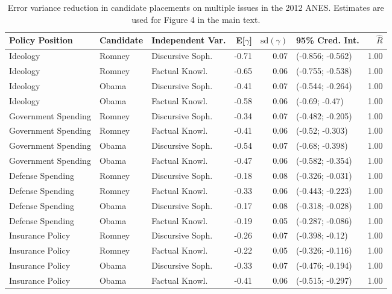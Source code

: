 \begin{table}[ht]
\centering
\caption{Error variance reduction in candidate placements on multiple issues in the 2012 ANES. 
         Estimates are used for Figure 4 in the main text.} 
\label{app:hetreg2012}
\begin{tabular}{lllrrlr}
  \hline
Policy Position & Candidate & Independent Var. & E[$\gamma$] & $\text{sd}(\gamma)$ & 95\% Cred. Int. & $\hat{R}$ \\ 
  \hline
Ideology & Romney & Discursive Soph. & -0.71 & 0.07 & (-0.856; -0.562) & 1.00 \\ 
  Ideology & Romney & Factual Knowl. & -0.65 & 0.06 & (-0.755; -0.538) & 1.00 \\ 
  Ideology & Obama & Discursive Soph. & -0.41 & 0.07 & (-0.544; -0.264) & 1.00 \\ 
  Ideology & Obama & Factual Knowl. & -0.58 & 0.06 & (-0.69; -0.47) & 1.00 \\ 
  Government Spending & Romney & Discursive Soph. & -0.34 & 0.07 & (-0.482; -0.205) & 1.00 \\ 
  Government Spending & Romney & Factual Knowl. & -0.41 & 0.06 & (-0.52; -0.303) & 1.00 \\ 
  Government Spending & Obama & Discursive Soph. & -0.54 & 0.07 & (-0.68; -0.398) & 1.00 \\ 
  Government Spending & Obama & Factual Knowl. & -0.47 & 0.06 & (-0.582; -0.354) & 1.00 \\ 
  Defense Spending & Romney & Discursive Soph. & -0.18 & 0.08 & (-0.326; -0.031) & 1.00 \\ 
  Defense Spending & Romney & Factual Knowl. & -0.33 & 0.06 & (-0.443; -0.223) & 1.00 \\ 
  Defense Spending & Obama & Discursive Soph. & -0.17 & 0.08 & (-0.318; -0.028) & 1.00 \\ 
  Defense Spending & Obama & Factual Knowl. & -0.19 & 0.05 & (-0.287; -0.086) & 1.00 \\ 
  Insurance Policy & Romney & Discursive Soph. & -0.26 & 0.07 & (-0.398; -0.12) & 1.00 \\ 
  Insurance Policy & Romney & Factual Knowl. & -0.22 & 0.05 & (-0.326; -0.116) & 1.00 \\ 
  Insurance Policy & Obama & Discursive Soph. & -0.33 & 0.07 & (-0.476; -0.194) & 1.00 \\ 
  Insurance Policy & Obama & Factual Knowl. & -0.41 & 0.06 & (-0.515; -0.297) & 1.00 \\ 

\end{tabular}
\end{table}
